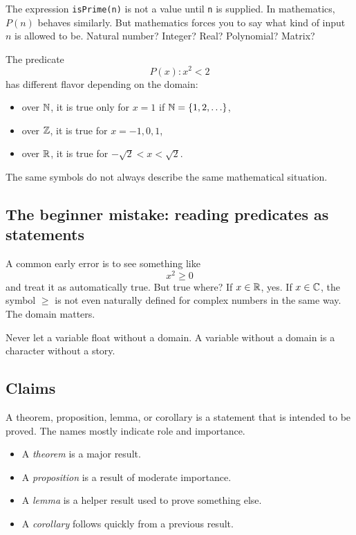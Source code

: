 \documentclass[12pt]{article}
\begin{document}
The expression \texttt{isPrime(n)} is not a value until \texttt{n} is supplied. In mathematics, $P(n)$ behaves similarly. But mathematics forces you to say what kind of input $n$ is allowed to be. Natural number? Integer? Real? Polynomial? Matrix?

The predicate
\[
P(x): x^2<2
\]
has different flavor depending on the domain:

\begin{itemize}
\item over $\mathbb{N}$, it is true only for $x=1$ if $\mathbb{N}=\{1,2,\ldots\}$,
\item over $\mathbb{Z}$, it is true for $x=-1,0,1$,
\item over $\mathbb{R}$, it is true for $-\sqrt2<x<\sqrt2$.
\end{itemize}

The same symbols do not always describe the same mathematical situation.

\subsection{The beginner mistake: reading predicates as statements}

A common early error is to see something like
\[
x^2\geq0
\]
and treat it as automatically true. But true where? If $x\in\mathbb{R}$, yes. If $x\in\mathbb{C}$, the symbol $\geq$ is not even naturally defined for complex numbers in the same way. The domain matters.

\begin{trapbox}
Never let a variable float without a domain. A variable without a domain is a character without a story.
\end{trapbox}

\subsection{Claims}

A theorem, proposition, lemma, or corollary is a statement that is intended to be proved. The names mostly indicate role and importance.

\begin{itemize}
\item A \emph{theorem} is a major result.
\item A \emph{proposition} is a result of moderate importance.
\item A \emph{lemma} is a helper result used to prove something else.
\item A \emph{corollary} follows quickly from a previous result.
\end{itemize}
\end{document}
